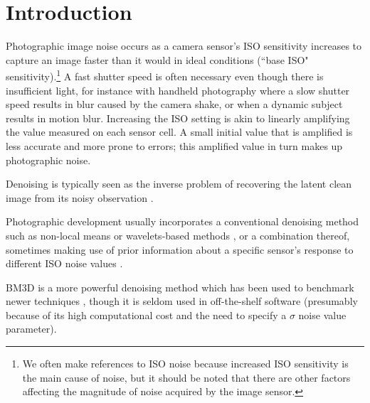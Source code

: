 \chapter{Introduction}\label{chap:Introduction}

Photographic image noise occurs as a camera sensor's ISO sensitivity increases to capture an image faster than it would in ideal conditions (``base ISO" sensitivity).\footnote{We often make references to ISO noise because increased ISO sensitivity is the main cause of noise, but it should be noted that there are other factors affecting the magnitude of noise acquired by the image sensor.} A fast shutter speed is often necessary even though there is insufficient light, for instance with handheld photography where a slow shutter speed results in blur caused by the camera shake, or when a dynamic subject results in motion blur. Increasing the ISO setting is akin to linearly amplifying the value measured on each sensor cell. A small initial value that is amplified is less accurate and more prone to errors; this amplified value in turn makes up photographic noise. 

Denoising is typically seen as the inverse problem of recovering the latent clean image from its noisy observation \cite{rednet}. 

Photographic development usually incorporates a conventional denoising method such as non-local means \cite{nlm} or wavelets-based methods \cite{wavelets-denoising}, or a combination thereof, sometimes making use of prior information about a specific sensor's response to different ISO noise values \cite{darktable-denoising}.

\acs{BM3D} \cite{bm3d} is a more powerful denoising method which has been used to benchmark newer techniques \cite{sidd}\cite{renoir}\cite{nind-ntire}\cite{learningtoseeinthedark}\cite{noise2noise}\cite{rednet}\cite{darmstadt}\cite{dncnn}\cite{microscopynoise}\cite{lossescomp}, though it is seldom used in off-the-shelf software (presumably because of its high computational cost and the need to specify a $\sigma$ noise value parameter). 

